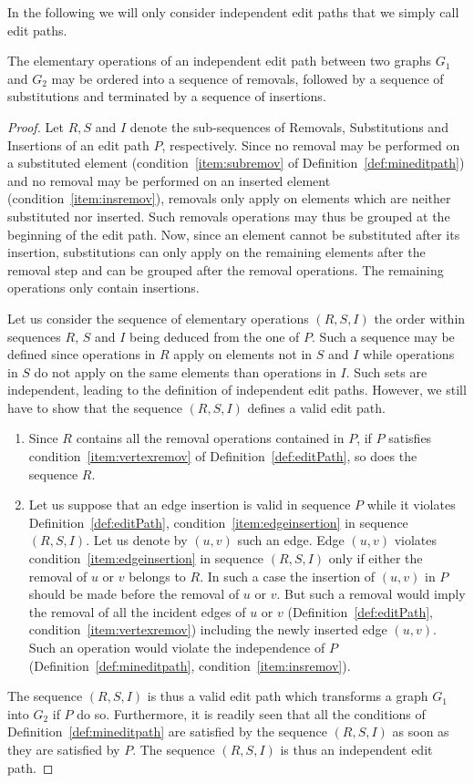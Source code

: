 In the following we will only
consider independent edit paths that we simply call edit paths.
\begin{proposition}
  The elementary operations of an independent edit path between two graphs
  $G_1$ and $G_2$ may be ordered into a sequence of removals,
  followed by a sequence of substitutions and terminated by a
  sequence of insertions.
\end{proposition}
\begin{proof}
  Let $R, S$ and $I$ denote the sub-sequences of
  Removals, Substitutions and Insertions of an edit path $P$,
  respectively. Since no removal may be performed on a substituted
  element (condition~\ref{item:subremov} of
  Definition~\ref{def:mineditpath}) and no removal may be performed on
  an inserted element (condition~\ref{item:insremov}), removals only
  apply on elements which are neither substituted nor inserted. Such
  removals operations may thus be grouped at the beginning of the edit
  path. Now, since an element cannot be substituted after its
  insertion, substitutions can only apply on the remaining elements after
  the removal step and can be grouped after the removal operations.  The
  remaining operations only contain insertions.

  Let us consider the sequence of elementary operations $(R,S,I)$
  the order within sequences $R$, $S$ and $I$ being deduced from the
  one of $P$. Such a sequence may be defined since operations in $R$
  apply on elements not in $S$ and $I$ while operations in $S$ do
  not apply on the same elements than operations in $I$. Such sets
  are independent, leading to the definition of independent edit
  paths. However, we still have to show that the sequence $(R,S,I)$
  defines a valid edit path.
  \begin{enumerate}
  \item Since $R$ contains all the removal operations contained in
    $P$, if $P$ satisfies condition~\ref{item:vertexremov} of
    Definition~\ref{def:editPath}, so does the sequence $R$.
  \item Let us suppose that an edge insertion is valid in sequence
    $P$ while it violates Definition~\ref{def:editPath},
    condition~\ref{item:edgeinsertion} in sequence $(R,S,I)$. Let us
    denote by $(u,v)$ such an edge. Edge $(u,v)$ violates
    condition~\ref{item:edgeinsertion} in sequence $(R,S,I)$ only if
    either the removal of $u$ or $v$ belongs to $R$.  In such a case
    the insertion of $(u,v)$ in $P$ should be made before the
    removal of $u$ or $v$. But such a removal would imply the
    removal of all the incident edges of $u$ or $v$
    (Definition~\ref{def:editPath},
    condition~\ref{item:vertexremov}) including the newly inserted
    edge $(u,v)$.  Such an operation would violate the independence
    of $P$ (Definition~\ref{def:mineditpath},
    condition~\ref{item:insremov}).
  \end{enumerate}
  The sequence $(R,S,I)$ is thus a valid edit path which transforms
  a graph $G_1$ into $G_2$ if $P$ do so.
  Furthermore, it is readily seen that all the conditions of Definition~\ref{def:mineditpath}
  are satisfied by the sequence $(R,S,I)$ as soon as they are satisfied by $P$.
  The sequence $(R,S,I)$ is thus an independent edit path.
\end{proof}
